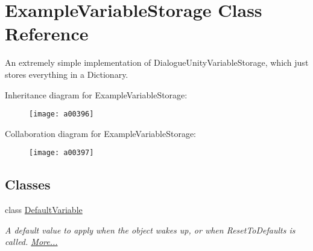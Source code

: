 \hypertarget{a00089}{\section{Example\-Variable\-Storage Class Reference}
\label{a00089}
}


An extremely simple implementation of Dialogue\-Unity\-Variable\-Storage, which just stores everything in a Dictionary.  




Inheritance diagram for Example\-Variable\-Storage\-:
\nopagebreak
\begin{figure}[H]
\begin{center}
\leavevmode
\texttt{[image: a00396]}
\end{center}
\end{figure}


Collaboration diagram for Example\-Variable\-Storage\-:
\nopagebreak
\begin{figure}[H]
\begin{center}
\leavevmode
\texttt{[image: a00397]}
\end{center}
\end{figure}
\subsection*{Classes}
\begin{DoxyCompactItemize}
\item 
class \hyperlink{a00089_a00376}{Default\-Variable}
\begin{DoxyCompactList}\small\item\em A default value to apply when the object wakes up, or when Reset\-To\-Defaults is called.  \hyperlink{a00089_a00376}{More...}\end{DoxyCompactList}\end{DoxyCompactItemize}
